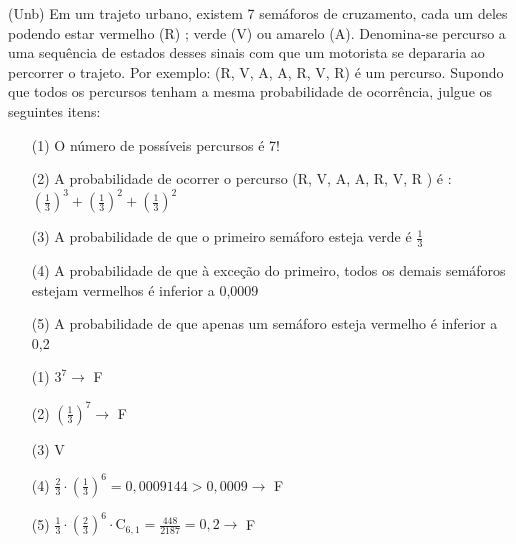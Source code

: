 \begin{ex}
(Unb) Em um trajeto urbano, existem 7 semáforos de cruzamento, cada um deles podendo estar vermelho (R) ; verde (V) ou amarelo (A). Denomina-se percurso a uma sequência de estados desses sinais com que um motorista se depararia ao percorrer o trajeto. Por exemplo: (R, V, A, A, R, V, R) é um percurso. Supondo que todos os percursos tenham a mesma probabilidade de ocorrência, julgue os seguintes itens:
   \begin{itemize}
   \item  [(1)] O número de possíveis percursos é 7!
   \item  [(2)] A probabilidade de ocorrer o percurso (R, V, A, A, R, V, R ) é :   $(\frac{1}{3})^3 + (\frac{1}{3})^2 + (\frac{1}{3})^2$
   \item  [(3)] A probabilidade de que o primeiro semáforo esteja verde é $\frac{1}{3}$
   \item  [(4)] A probabilidade de que à exceção do primeiro, todos os demais semáforos estejam vermelhos é inferior a 0,0009
   \item  [(5)] A probabilidade de que apenas um semáforo esteja vermelho é inferior a 0,2
   \end{itemize}
     \begin{sol}
       \phantom{A} 
       \begin{itemize}
           \item [(1)] $3^7 \rightarrow$ F 
           \item [(2)] $(\frac{1}{3})^7 \rightarrow$ F
           \item [(3)] V
           \item [(4)] $\frac{2}{3}\cdot(\frac{1}{3})^6=0,0009144>0,0009 \rightarrow$  F
           \item [(5)] $\frac{1}{3}\cdot(\frac{2}{3})^6\cdot \mathrm{C}_{6,1}=\frac{448}{2187}=0,2 \rightarrow$ F
       \end{itemize}
     \end{sol}
\end{ex}